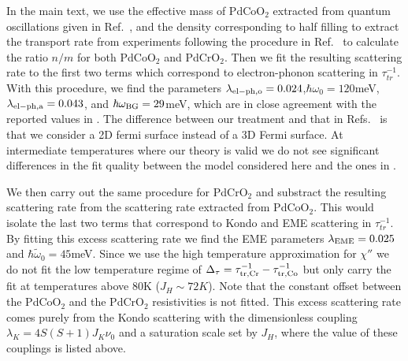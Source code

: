 \documentclass[aps,prl,twocolumn,superscriptaddress,amsmath,nofootinbib,10pt,floatfix]{revtex4-2}
\begin{document}
\begin{widetext}
In the main text, we use the effective mass of PdCoO$_{2}$ extracted
from quantum oscillations given in Ref.~\cite{sunko_angle_2019}, and the density corresponding
to half filling to extract the transport rate from experiments following
the procedure in Ref.~\cite{bruin_similarity_2013} to calculate the ratio $n/m$ for both PdCoO$_{2}$ and PdCrO$_{2}$. Then we fit the resulting scattering
rate to the first two terms which correspond to electron-phonon scattering
in $\tau_{tr}^{-1}$. With this procedure, we find the parameters
$\lambda_{\rm el-ph,o}=0.024$,$\hbar\omega_{0}=120$meV,$\lambda_{\rm el-ph,a}=0.043$,
and $\hbar\omega_{\rm BG}=29$meV, which are in close agreement with the
reported values in \cite{Hicks_mobility_2012, roles_highfreq_pdcoo2_takatsu_2007}. The difference between our treatment
and that in Refs.~\cite{Hicks_mobility_2012, roles_highfreq_pdcoo2_takatsu_2007} is that we consider a 2D fermi surface instead
of a 3D Fermi surface. At intermediate temperatures
where our theory is valid we do not see significant differences in
the fit quality between the model considered here and the ones in
\cite{Hicks_mobility_2012, roles_highfreq_pdcoo2_takatsu_2007} .

We then carry out the same procedure for PdCrO$_{2}$ and substract
the resulting scattering rate from the scattering rate extracted from
PdCoO$_{2}$. This would isolate the last two terms that correspond
to Kondo and EME scattering in $\tau_{tr}^{-1}$. By fitting this
excess scattering rate we find the EME parameters $\lambda_{\rm EME}=0.025$
and $\hbar\tilde{\omega}_{0}=45$meV. Since we use the high temperature
approximation for $\chi''$ we do not fit the low temperature regime
of $\Delta_{\tau}=\tau_{\rm{tr,Cr}}^{-1}-\tau_{\rm{tr,Co}}^{-1}$ but only carry
the fit at temperatures above 80K ($J_{H}\sim72K$). Note that the
constant offset between the PdCoO$_{2}$ and the PdCrO$_{2}$ resistivities
is not fitted. This excess scattering rate comes purely from the Kondo
scattering with the dimensionless coupling $\lambda_{K}=4S\left(S+1\right)J_{K}\nu_{0}$
and a saturation scale set by $J_{H}$, where the value of these couplings
is listed above. 


\end{widetext}
\end{document}
